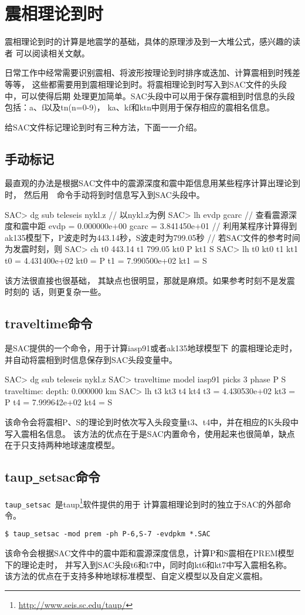 \section{震相理论到时}
震相理论到时的计算是地震学的基础，具体的原理涉及到一大堆公式，感兴趣的读者
可以阅读相关文献。

日常工作中经常需要识别震相、将波形按理论到时排序或迭加、计算震相到时残差等等，
这些都需要用到震相理论到时。将震相理论到时写入到SAC文件的头段中，可以使得后期
处理更加简单。SAC头段中可以用于保存震相到时信息的头段包括：a、f以及tn(n=0-9)，
ka、kf和ktn中则用于保存相应的震相名信息。

给SAC文件标记理论到时有三种方法，下面一一介绍。

\subsection{手动标记}
最直观的办法是根据SAC文件中的震源深度和震中距信息用某些程序计算出理论到时，
然后用~~命令手动将到时信息写入到SAC头段中。
\begin{SACCode}
SAC> dg sub teleseis nykl.z     // 以nykl.z为例
SAC> lh evdp gcarc              // 查看震源深度和震中距
     evdp = 0.000000e+00
    gcarc = 3.841450e+01
// 利用某程序计算得到ak135模型下，P波走时为443.14秒，S波走时为799.05秒
// 若SAC文件的参考时间为发震时刻，则
SAC> ch t0 443.14 t1 799.05 kt0 P kt1 S
SAC> lh t0 kt0 t1 kt1
     t0 = 4.431400e+02
    kt0 = P
     t1 = 7.990500e+02
    kt1 = S
\end{SACCode}
该方法很直接也很基础， 其缺点也很明显，那就是麻烦。如果参考时刻不是发震时刻的
话，则更复杂一些。

\subsection{traveltime命令}
是SAC提供的一个命令，用于计算iasp91或者ak135地球模型下
的震相理论走时，并自动将震相到时信息保存到SAC头段变量中。
\begin{SACCode}
SAC> dg sub teleseis nykl.z
SAC> traveltime model iasp91 picks 3 phase P S
traveltime: depth: 0.000000 km
SAC> lh t3 kt3 t4 kt4
         t3 = 4.430530e+02
        kt3 = P
         t4 = 7.999642e+02
        kt4 = S
\end{SACCode}
该命令会将震相P、S的理论到时依次写入头段变量t3、t4中，并在相应的K头段中写入震相名信息。
该方法的优点在于是SAC内置命令，使用起来也很简单，缺点在于只支持两种地球速度模型。

\subsection{taup\texttt{\_}setsac命令}
\verb+taup_setsac+~是taup\footnote{\url{http://www.seis.sc.edu/taup/}}软件提供的用于
计算震相理论到时的独立于SAC的外部命令。
\begin{verbatim}
$ taup_setsac -mod prem -ph P-6,S-7 -evdpkm *.SAC
\end{verbatim}
该命令会根据SAC文件中的震中距和震源深度信息，计算P和S震相在PREM模型下的理论走时，
并写入到SAC头段t6和t7中，同时向kt6和kt7中写入震相名称。
该方法的优点在于支持多种地球标准模型、自定义模型以及自定义震相。

